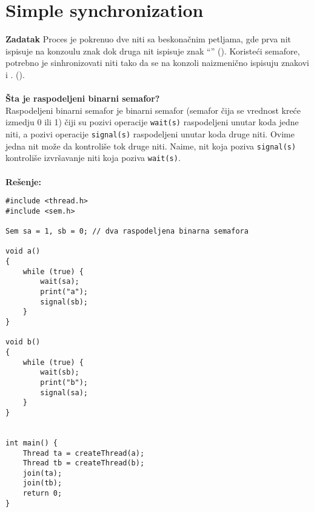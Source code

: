 \clearpage
\section{\latin Simple synchronization}
\textbf{\large Zadatak} Proces je pokrenuo dve niti sa beskona\v{c}nim petljama, gde prva nit ispisuje na konzoulu znak  dok druga nit ispisuje znak ``'' (). Koriste\'{c}i semafore, potrebno je sinhronizovati niti tako da se na konzoli naizmeni\v{c}no ispisuju znakovi  i . ().
\\\\
\textbf{\v{S}ta je raspodeljeni binarni semafor?}\\
Raspodeljeni binarni semafor je binarni semafor (semafor \v{c}ija se vrednost kre\'{c}e izmedju 0 ili 1) \v{c}iji su pozivi operacije \texttt{wait(s)} raspodeljeni unutar koda jedne niti, a pozivi operacije \texttt{signal(s)} raspodeljeni unutar koda druge niti. Ovime jedna nit mo\v{z}e da kontroli\v{s}e tok druge niti. Naime, nit koja poziva \texttt{signal(s)} kontroli\v{s}e izvr\v{s}avanje niti koja poziva \texttt{wait(s)}.
\\\\
\textbf{\large Re\v{s}enje:} 
\begin{lstlisting}
#include <thread.h>
#include <sem.h>

Sem sa = 1, sb = 0; // dva raspodeljena binarna semafora

void a() 
{
    while (true) {
        wait(sa);
        print("a");
		signal(sb);
    }
}

void b() 
{
    while (true) {
        wait(sb);
        print("b");
		signal(sa);
    }
}


int main() {
    Thread ta = createThread(a);
    Thread tb = createThread(b);
    join(ta);
    join(tb);
    return 0;
}

\end{lstlisting}